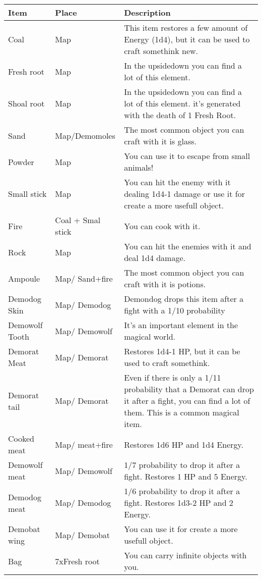 \begin{center}
	\begin{tabular}[c]{| p{2cm} | p{} | p{5cm} |}
		\hline
		Item &  Place & Description \\
		\hline
		Coal & Map & This item restores a few amount of Energy (1d4), but it can be used to craft somethink new.\\
		\hline
		Fresh root &  Map & In the upsidedown you can find a lot of this element.\\
		\hline
		Shoal root &  Map & In the upsidedown you can find a lot of this element. it's generated with the death of 1 Fresh Root.\\
		\hline
		Sand &   Map/Demomoles & The most common object you can craft with it is glass.\\
		\hline
		Powder &  Map & You can use it to escape from small animals!\\
		\hline
		Small stick & Map & You can hit the enemy with it dealing 1d4-1 damage or use it for create a more usefull object.\\
		\hline
		Fire & Coal + Smal stick & You can cook with it.\\
		\hline
		Rock & Map & You can hit the enemies with it and deal 1d4 damage.\\
		\hline
		Ampoule & Map/ Sand+fire & The most common object you can craft with it is potions.\\
		\hline
		Demodog Skin & Map/ Demodog & Demondog drops this item after a fight with a 1/10 probability\\
		\hline
		Demowolf Tooth &  Map/ Demowolf & It's an important element in the magical world.\\
		\hline
		
		Demorat Meat & Map/ Demorat & Restores 1d4-1 HP, but it can be used to craft somethink.\\
		\hline
		Demorat tail &  Map/ Demorat & Even if there is only a 1/11 probability that a Demorat can drop it after a fight, you can find a lot of them. This is a common magical item.\\
		\hline
		Cooked meat &  Map/ meat+fire & Restores 1d6 HP and 1d4 Energy.\\
		\hline
		Demowolf meat &   Map/ Demowolf & 1/7 probability to drop it after a fight. Restores 1 HP and 5 Energy.\\
		\hline
		Demodog meat &  Map/ Demodog & 1/6 probability to drop it after a fight. Restores 1d3-2 HP and 2 Energy.\\
		\hline
		Demobat wing & Map/ Demobat & You can use it for create a more usefull object.\\
		\hline
		Bag & 7xFresh root& You can carry infinite objects with you.\\
		\hline
			\end{tabular}
	\end{center}

\newpage